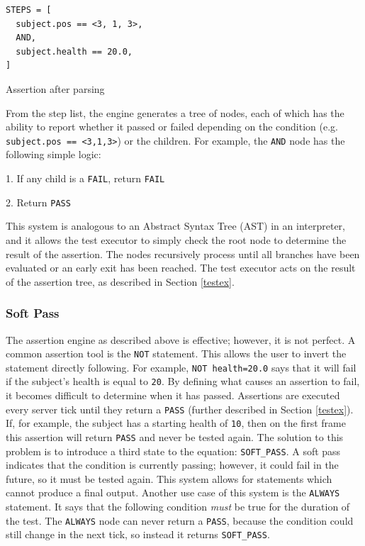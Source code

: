\documentclass[12pt]{article}
\def\code#1{\texttt{#1}}
\begin{document}
\begin{onehalfspacing}
\begin{listing}[H]
\begin{verbatim}
STEPS = [
  subject.pos == <3, 1, 3>,
  AND,
  subject.health == 20.0,
]
\end{verbatim}
\caption{Assertion after parsing}
\label{lst:4_2_2}
\end{listing}


From the step list, the engine generates a tree of nodes, each of which
has the ability to report whether it passed or failed depending on the
condition (e.g. \code{subject.pos == \textless3,1,3\textgreater}) or the
children. For example, the \code{AND} node has the following simple logic:

1. If any child is a \code{FAIL}, return \code{FAIL}

2. Return \code{PASS}

This system is analogous to an Abstract Syntax Tree (AST) in an
interpreter, and it allows the test executor to simply check the root
node to determine the result of the assertion. The nodes recursively
process until all branches have been evaluated or an early exit has been
reached. The test executor acts on the result of the assertion tree, as
described in Section \ref{testex}.

\subsubsection{Soft Pass}

The assertion engine as described above is effective; however, it is not
perfect. A common assertion tool is the \code{NOT} statement. This allows the
user to invert the statement directly following. For example, \code{NOT
health=20.0} says that it will fail if the subject's health is equal to
\code{20}. By defining what causes an assertion to fail, it becomes difficult
to determine when it has passed. Assertions are executed every server
tick until they return a \code{PASS} (further described in Section \ref{testex}). If,
for example, the subject has a starting health of \code{10}, then on the first
frame this assertion will return \code{PASS} and never be tested again. The
solution to this problem is to introduce a third state to the equation:
\code{SOFT\_PASS}. A soft pass indicates that the condition is currently
passing; however, it could fail in the future, so it must be tested
again. This system allows for statements which cannot produce a final
output. Another use case of this system is the \code{ALWAYS} statement. It says
that the following condition \emph{must} be true for the duration of the
test. The \code{ALWAYS} node can never return a \code{PASS}, because the condition
could still change in the next tick, so instead it returns \code{SOFT\_PASS}.


\end{onehalfspacing}
\end{document}
